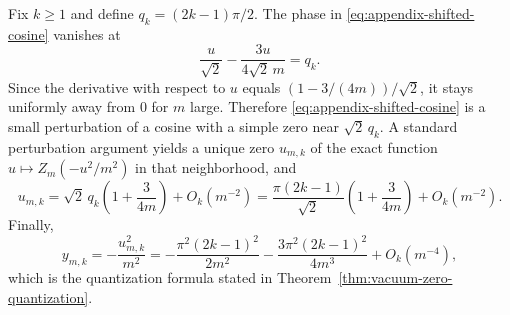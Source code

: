 Fix $k\ge1$ and define $q_k=(2k-1)\pi/2$.
The phase in \eqref{eq:appendix-shifted-cosine} vanishes at
\[
\frac{u}{\sqrt2}-\frac{3u}{4\sqrt2\,m}=q_k.
\]
Since the derivative with respect to $u$ equals $(1-3/(4m))/\sqrt2$, it stays uniformly away from $0$ for $m$ large.
Therefore \eqref{eq:appendix-shifted-cosine} is a small perturbation of a cosine with a simple zero near $\sqrt2\,q_k$.
A standard perturbation argument yields a unique zero $u_{m,k}$ of the exact function $u\mapsto Z_m(-u^2/m^2)$ in that neighborhood, and
\[
u_{m,k}
=
\sqrt2\,q_k\left(1+\frac{3}{4m}\right)+O_k(m^{-2})
=
\frac{\pi(2k-1)}{\sqrt2}\left(1+\frac{3}{4m}\right)+O_k(m^{-2}).
\]
Finally,
\[
y_{m,k}=-\frac{u_{m,k}^2}{m^2}
=
-\frac{\pi^2(2k-1)^2}{2m^2}
-\frac{3\pi^2(2k-1)^2}{4m^3}
+O_k(m^{-4}),
\]
which is the quantization formula stated in Theorem~\ref{thm:vacuum-zero-quantization}.
